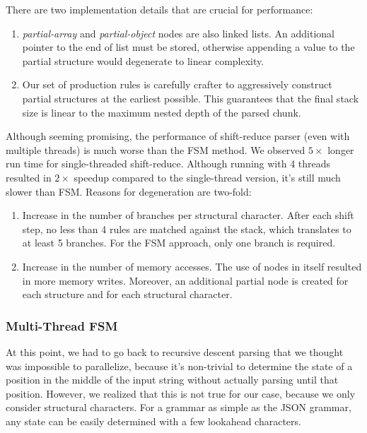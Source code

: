 \documentclass[11pt]{article}
\begin{document}
There are two implementation details that are crucial for performance:
\begin{enumerate}
  \item \textit{partial-array} and \textit{partial-object} nodes are also linked lists. An additional pointer to the end of list must be stored, otherwise appending a value to the partial structure would degenerate to linear complexity.
  \item Our set of production rules is carefully crafter to aggressively construct partial structures at the earliest possible. This guarantees that the final stack size is linear to the maximum nested depth of the parsed chunk.
\end{enumerate}

Although seeming promising, the performance of shift-reduce parser (even with multiple threads) is much worse than the FSM method. We observed $5\times$ longer run time for single-threaded shift-reduce. Although running with 4 threads resulted in $2\times$ speedup compared to the single-thread version, it's still much slower than FSM. Reasons for degeneration are two-fold:
\begin{enumerate}
  \item Increase in the number of branches per structural character. After each shift step, no less than 4 rules are matched against the stack, which translates to at least 5 branches. For the FSM approach, only one branch is required.
  \item Increase in the number of memory accesses. The use of nodes in itself resulted in more memory writes. Moreover, an additional partial node is created for each structure and for each structural character.
\end{enumerate}


\subsubsection{Multi-Thread FSM}
\label{sec:parse:parallel-fsm}

At this point, we had to go back to recursive descent parsing that we thought was impossible to parallelize, because it's non-trivial to determine the state of a position in the middle of the input string without actually parsing until that position. However, we realized that this is not true for our case, because we only consider structural characters. For a grammar as simple as the JSON grammar, any state can be easily determined with a few lookahead characters.
\end{document}
